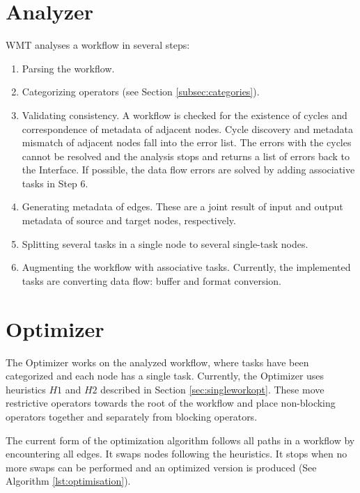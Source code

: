 \documentclass[12pt,openany,onecolumn]{book}
\begin{document}
\section{Analyzer}\label{sec:analizer}
WMT analyses a workflow in several steps:
\begin{enumerate}
\item Parsing the workflow.
\item Categorizing operators (see Section \ref{subsec:categories}).
\item Validating consistency. A workflow is checked for the existence of cycles and correspondence of metadata of  adjacent nodes. Cycle discovery and metadata mismatch of adjacent nodes fall into the error list. The errors with the cycles cannot be resolved and the analysis stops and returns a list of errors back to the Interface. If possible, the data flow errors are solved by adding associative tasks in Step 6.
\item Generating metadata of edges. These are a joint result of input and output metadata of source and target nodes, respectively.
\item Splitting several tasks in a single node to several single-task nodes.
\item Augmenting the workflow with associative tasks. Currently, the implemented tasks are converting data flow: buffer and format conversion.
\end{enumerate}

\section{Optimizer}\label{sec:optimizer}
The Optimizer works on the analyzed workflow, where tasks have been categorized and each node has a single task.
Currently, the Optimizer uses heuristics $H1$ and $H2$ described in Section \ref{sec:singleworkopt}. These move restrictive operators towards the root of the workflow and place non-blocking operators together and separately from blocking operators.

The current form of the optimization algorithm follows all paths in a workflow by encountering all edges. It swaps nodes following the heuristics. It stops when no more swaps can be performed and an optimized version is produced (See Algorithm \ref{lst:optimisation}).
\end{document}
